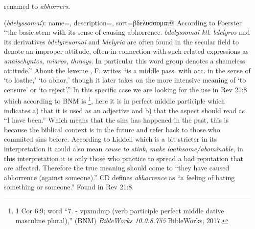 \item[\sout{Abominable},] renamed to \emph{abhorrers}.
\item[Abhorrer,]

(\textit{bdelyssomai}):
{
    name=,
    description={},
    sort=βδελυσσομαι@
}
According to Foerster ``the basic stem with its sense of causing abhorrence. \emph{bdelyssomai ktl}. \emph{bdelyros} and its derivatives
\emph{bdelyreuomai} and \emph{bdelyria} are often found in the secular field to denote an improper attitude, often in connection with such related expressions
as \emph{anaischyntos}, \emph{miaros}, \emph{thrasys}. In particular this word group denotes a shameless attitude.''
About the lexeme , F. writes ``is a middle pass. with acc. in the sense of `to loathe,' `to abhor,' though it later takes on the more intensive
meaning of `to censure' or `to reject'.''
In this specific case we are looking for the use in Rev 21:8 which according to BNM is \footnote{1 Cor 6:9; word ``7.  -
vpxmdmp (verb participle perfect middle dative masculine plural),'' (BNM) \emph{BibleWorks 10.0.8.755} BibleWorks, 2017.},
here it is in perfect middle participle which indicates a) that it is used as an adjective and b) that the aspect should read as ``I have been.'' Which means that the sins has happened
in the past, this is because the biblical context is in the future and refer back to those who commited sins before. According to Liddell which is a bit stricter in its interpretation
it could also mean \emph{cause to stink}, \emph{make loathsome/abominable}, in this interpretation it is only those who practice to spread a bad reputation that are affected.
Therefore the true meaning should come to ``they have caused abhorrence (against someone).'' CD defines \emph{abhorrence} as ``a feeling of hating something or someone.''
Found in Rev 21:8.
